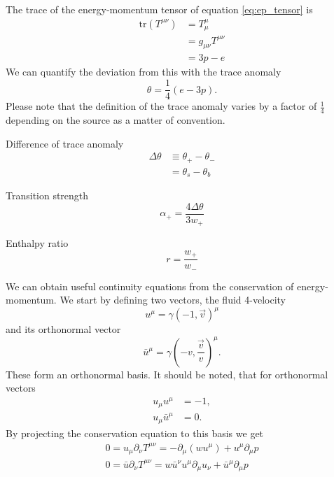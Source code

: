 The trace of the energy-momentum tensor of equation \ref{eq:ep_tensor} is
\begin{align}
\text{tr} (T^{\mu \nu})
&= T^\mu_\mu \\
&= g_{\mu \nu} T^{\mu \nu} \\
&=3p - e
\end{align}
We can quantify the deviation from this with the trace anomaly
\cites[eq. 7.24]{lecture_notes}[eq. 28]{giese_2020}
\begin{equation}
\theta = \frac{1}{4}(e-3p).
\end{equation}
Please note that the definition of the trace anomaly varies by a factor of $\frac{1}{4}$ depending on the source as a matter of convention.

Difference of trace anomaly
\begin{align}
\Delta \theta
&\equiv \theta_+ - \theta_- \\
&= \theta_s - \theta_b
\end{align}

Transition strength
\begin{equation}
\alpha_+ = \frac{4 \Delta \theta}{3 w_+}
\end{equation}

Enthalpy ratio
\begin{equation}
r = \frac{w_+}{w_-}
\end{equation}

We can obtain useful continuity equations from the conservation of energy-momentum.
We start by defining two vectors, the fluid 4-velocity
\begin{equation}
u^\mu = \gamma(-1, \overrightarrow{v})^\mu
\end{equation}
and its orthonormal vector
\begin{equation}
\bar{u}^\mu = \gamma(-v, \frac{\overrightarrow{v}}{v})^\mu.
\end{equation}
These form an orthonormal basis.
It should be noted, that for orthonormal vectors
\begin{align}
u_\mu u^\mu &= -1, \\
u_\mu \bar{u}^\mu &= 0.
\end{align}
By projecting the conservation equation to this basis we get
\begin{align}
0 = u_\mu \partial_\nu T^{\mu \nu} = -\partial_\mu (w u^\mu) + u^\mu \partial_\mu p \\
0 = \bar{u} \partial_\nu T^{\mu \nu} = w \bar{u}^\nu u^\mu \partial_\mu u_\nu + \bar{u}^\mu \partial_\mu p
\end{align}

